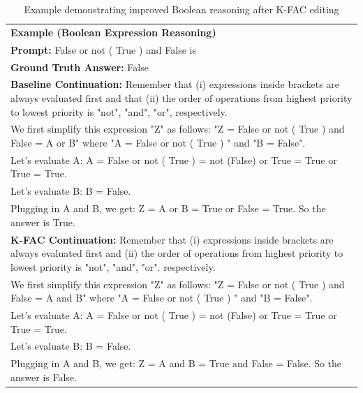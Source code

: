 \documentclass{article} %
\begin{document}
\begin{table}[ht]
\centering
\small
\begin{tabular}{p{}}
\toprule
\textbf{Example (Boolean Expression Reasoning)} \\[0.3em]
\textbf{Prompt:} False or not ( True ) and False is \\[0.5em]

\textbf{Ground Truth Answer:} False \\[0.5em]

\textbf{Baseline Continuation:}  
Remember that (i) expressions inside brackets are always evaluated first and that (ii) the order of operations from highest priority to lowest priority is "not", "and", "or", respectively. \\
We first simplify this expression "Z" as follows: "Z = False or not ( True ) and False = \colorbox{blue!15}{A or B}" where "A = False or not ( True ) " and "B = False".\\
Let's evaluate A: A = False or not ( True ) = not (False) or True = True or True = True. \\
Let's evaluate B: B = False. \\
Plugging in A and B, we get: Z = A or B = True or False = True. So the answer is True. \\





\textbf{K-FAC Continuation:}  
Remember that (i) expressions inside brackets are always evaluated first and (ii) the order of operations from highest priority to lowest priority is "not", "and", "or". respectively. \\
We first simplify this expression "Z" as follows: "Z = False or not ( True ) and False = \colorbox{red!15}{A and B}" where "A = False or not ( True ) " and "B = False". \\ 
Let's evaluate A: A = False or not ( True ) = not (False) or True = True or True = True. \\
Let's evaluate B: B = False. \\
Plugging in A and B, we get: Z = A and B = True and False = False. So the answer is False.\\
\bottomrule
\end{tabular}
\caption{Example demonstrating improved Boolean reasoning after K-FAC editing}
\label{tab:example_boolean_reasoning}
\vspace{-0.5em}
\end{table}
\end{document}
